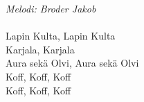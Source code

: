 {\footnotesize\textit{Melodi: Broder Jakob}}\\
\\
Lapin Kulta, Lapin Kulta\\
Karjala, Karjala\\
Aura sekä Olvi, Aura sekä Olvi\\
Koff, Koff, Koff\\
Koff, Koff, Koff
